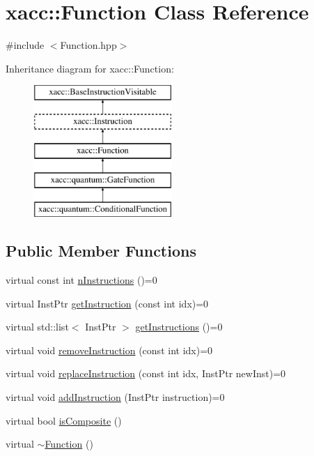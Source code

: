 \hypertarget{a02456}{}\section{xacc\+:\+:Function Class Reference}
\label{a02456}


{\ttfamily \#include $<$Function.\+hpp$>$}

Inheritance diagram for xacc\+:\+:Function\+:\begin{figure}[H]
\begin{center}
\leavevmode
\includegraphics[height=5.000000cm]{a02456}
\end{center}
\end{figure}
\subsection*{Public Member Functions}
\begin{DoxyCompactItemize}
\item 
virtual const int \hyperlink{a02456_a8901985525f59713e14c61713e07c086}{n\+Instructions} ()=0
\item 
virtual Inst\+Ptr \hyperlink{a02456_afa549fc91b5a05f26d8139954a7e0ed5}{get\+Instruction} (const int idx)=0
\item 
virtual std\+::list$<$ Inst\+Ptr $>$ \hyperlink{a02456_aaf80bd3d49113a92b520785572663032}{get\+Instructions} ()=0
\item 
virtual void \hyperlink{a02456_ab6478b09bb28e194bb555b3180737733}{remove\+Instruction} (const int idx)=0
\item 
virtual void \hyperlink{a02456_a2ef6a4923a6734f90f6ee3d94d263af0}{replace\+Instruction} (const int idx, Inst\+Ptr new\+Inst)=0
\item 
virtual void \hyperlink{a02456_aa8c9ec2d08be75c69399d4254b0216f5}{add\+Instruction} (Inst\+Ptr instruction)=0
\item 
virtual bool \hyperlink{a02456_aa75500c657b5c3e0e36213e1506aad97}{is\+Composite} ()
\item 
virtual \hyperlink{a02456_a04b25ba4da1ddfa4ec4ec6d6ffb25bc3}{$\sim$\+Function} ()
\end{DoxyCompactItemize}
